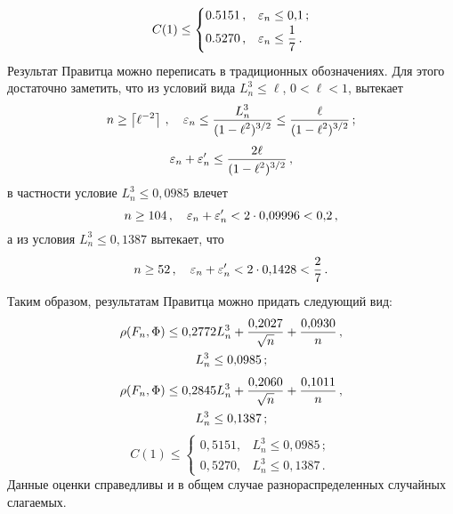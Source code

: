 \begin{multicols}{2}
\noindent
$$
C(1)\le
\begin{cases}
    0.5151\,, & \varepsilon_n\le0{,}1\,; \\
    0.5270\,, & \varepsilon_n\le \displaystyle\frac{\displaystyle 1\mathstrut}{\displaystyle 7\mathstrut}\,.
\end{cases}
$$
Результат Правитца можно переписать в традиционных обозначениях. Для
этого достаточно заметить, что из условий вида ${L_n^3\le\ell}$,
$0<\ell<1$, вытекает
$$
n\ge\left\lceil\ell^{-2}\right\rceil\,,\quad \varepsilon_n\le
\displaystyle\frac{\displaystyle L_n^3\mathstrut}{\displaystyle (1-\ell^2)^{3/2}\mathstrut}\le
\displaystyle\frac{\displaystyle \ell\mathstrut}{\displaystyle (1-\ell^2)^{3/2}\mathstrut}\,;
$$
$$
\varepsilon_n+\varepsilon_n'\le\displaystyle\frac{\displaystyle 2\ell\mathstrut}{\displaystyle (1-\ell^2)^{3/2}\mathstrut}\,,
$$
в частности условие ${L_n^3\le 0{,}0985}$ влечет
$$
n\ge 104\,,\quad\varepsilon_n+\varepsilon_n'<2\cdot 0{,}09996<0{,}2\,,
$$
а из условия ${L_n^3\le 0{,}1387}$ вытекает, что
$$
n\ge52\,,\quad\varepsilon_n+\varepsilon_n'<2\cdot0{,}1428<\displaystyle\frac{\displaystyle 2\mathstrut}{\displaystyle 7\mathstrut}\,.
$$
Таким образом, результатам Правитца можно придать следующий вид:
\begin{multline}
\rho(F_n,\Phi)\le 0{,}2772 L_n^3+\displaystyle\frac{\displaystyle 0{,}2027\mathstrut}{\displaystyle \sqrt n\mathstrut}+
\displaystyle\frac{\displaystyle 0{,}0930\mathstrut}{\displaystyle n\mathstrut}\,,\\
 L_n^3\le 0{,}0985\,; \label{Prawitz_exp1}
\end{multline}
\begin{multline}
\rho(F_n,\Phi)\le 0{,}2845 L_n^3+\displaystyle\frac{\displaystyle 0{,}2060\mathstrut}{\displaystyle \sqrt n\mathstrut}+
\displaystyle\frac{\displaystyle 0{,}1011\mathstrut}{\displaystyle n\mathstrut}\,,\\
 L_n^3\le0{,}1387\,; \label{Prawitz_exp2}
\end{multline}
\begin{equation}
\label{Prawitz_abs_asympt_estim}
C(1)\le
\begin{cases}
0{,}5151,& L_n^3\le0{,}0985\,;\\
0{,}5270,& L_n^3\le0{,}1387\,.\end{cases}
\end{equation}
Данные оценки справедливы и в общем случае разнораспределенных
случайных слагаемых.


\end{multicols}
